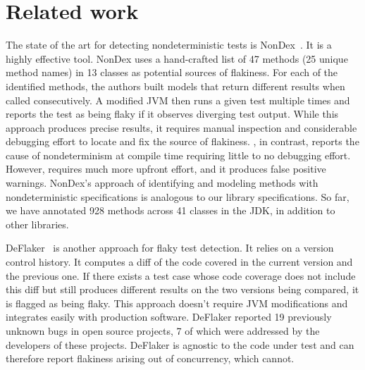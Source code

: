 \section{Related work}\label{sec:related}

The state of the art for detecting nondeterministic tests is
NonDex~\cite{ShiGLM2016}.  It is a highly effective tool.
NonDex uses a hand-crafted list of 47 methods (25 unique method names)
in 13 classes as potential sources of flakiness. 
For each of the identified methods, the authors built models that
return different results when called consecutively. A modified JVM then
runs a given test multiple times and reports the test as being flaky if it observes
diverging test output. While this approach produces precise results, it requires manual inspection
and considerable debugging effort to locate and fix the source of flakiness. \TheDeterminismChecker, in
contrast, reports the cause of nondeterminism at compile time requiring
little to no debugging effort.  However, \theDeterminismChecker requires
much more upfront effort, and it produces false positive warnings.
NonDex's approach of identifying and modeling methods with nondeterministic
specifications is analogous to our library specifications. So far, we have annotated
928 methods across 41 classes in the JDK, in addition to other libraries.

DeFlaker~\cite{BellLHEYM2018} is another approach for flaky test detection. It
relies on a
version control history. It computes a diff of the code covered
in the current version and the previous one. If there exists a test case whose code coverage does not include
this diff but still produces different results on the two versions being compared, it is flagged as being flaky.
This approach doesn't require JVM modifications
and integrates easily with production software. DeFlaker reported 19 previously unknown bugs
in open source projects, 7 of which were addressed by the developers of these projects. DeFlaker is agnostic
to the code under test and can therefore report flakiness arising out of concurrency, which \theDeterminismChecker cannot.

